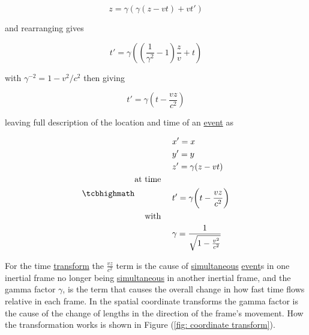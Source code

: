\begin{equation}
	z = {\gamma} ( {\gamma} (z-vt)+vt{'})
\end{equation}

and rearranging gives

\begin{equation}
	t{'} = {\gamma} \left( \left( \dfrac{1}{{\gamma}^2}-1 \right)\frac{z}{v} + t \right)
\end{equation}

with ${\gamma}^{-2}=1-v^2/c^2$ then giving

\begin{equation}
	t{'} = {\gamma} \left( t - \dfrac{vz}{c^2} \right)
\end{equation}

leaving full description of the location and time of an \hyperlink{def-event}{event} as

\begin{equation}
	\mhl{
		\begin{aligned}
			 & x{'}=x                                           \\
			 & y{'}=y                                           \\
			 & z{'} = {\gamma} (z-vt)                           \\
			\text{at time \ \ \ }                             \\
			 & t{'}={\gamma} \bigg(t-\frac{vz}{c^2}\bigg)       \\
			\text{with \ \ \ }                                \\
			 & {\gamma} = \dfrac{1}{\sqrt{1-\frac{v^2}{c^2}}}
		\end{aligned}
	}
	\label{eq: Lorentz transformation}
\end{equation}

For the time \hyperlink{def-transform}{transform} the $\frac{vz}{c^2}$ term is the cause of \hyperlink{def-simultaneity}{simultaneous} \hyperlink{def-event}{event}s in one inertial frame no longer being \hyperlink{def-simultaneity}{simultaneous} in another inertial frame, and the gamma factor ${\gamma}$, is the term that causes the overall change in how fast time flows relative in each frame.
In the spatial coordinate transforms the gamma factor is the cause of the change of lengths in the direction of the frame's movement.
How the transformation works is shown in Figure (\ref{fig: coordinate transform}).

